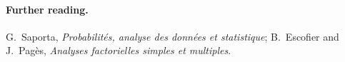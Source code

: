\begin{notechapter}
\paragraph{Further reading.} G.~Saporta, \emph{Probabilit\'es, analyse des donn\'ees et statistique};
B.~Escofier and J.~Pag\`es, \emph{Analyses factorielles simples et multiples}.

\end{notechapter}
